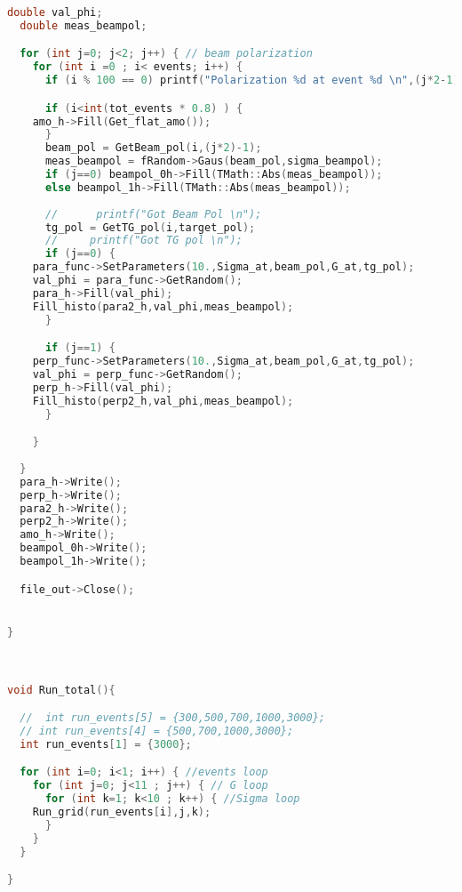 \begin{lstlisting}[language=C++]
  double val_phi;
  double meas_beampol;

  for (int j=0; j<2; j++) { // beam polarization
    for (int i =0 ; i< events; i++) {
      if (i % 100 == 0) printf("Polarization %d at event %d \n",(j*2-1),i);

      if (i<int(tot_events * 0.8) ) {
	amo_h->Fill(Get_flat_amo());
      }
      beam_pol = GetBeam_pol(i,(j*2)-1);
      meas_beampol = fRandom->Gaus(beam_pol,sigma_beampol);
      if (j==0) beampol_0h->Fill(TMath::Abs(meas_beampol));
      else beampol_1h->Fill(TMath::Abs(meas_beampol));
   
      //      printf("Got Beam Pol \n");
      tg_pol = GetTG_pol(i,target_pol);
      //     printf("Got TG pol \n");
      if (j==0) {
	para_func->SetParameters(10.,Sigma_at,beam_pol,G_at,tg_pol);
	val_phi = para_func->GetRandom();
	para_h->Fill(val_phi);
	Fill_histo(para2_h,val_phi,meas_beampol);
      }

      if (j==1) {
	perp_func->SetParameters(10.,Sigma_at,beam_pol,G_at,tg_pol);
	val_phi = perp_func->GetRandom();
	perp_h->Fill(val_phi);
	Fill_histo(perp2_h,val_phi,meas_beampol);
      }

    }
    
  }
  para_h->Write();
  perp_h->Write();
  para2_h->Write();
  perp2_h->Write();
  amo_h->Write();
  beampol_0h->Write();
  beampol_1h->Write();

  file_out->Close();


}



void Run_total(){

  //  int run_events[5] = {300,500,700,1000,3000};
  // int run_events[4] = {500,700,1000,3000};
  int run_events[1] = {3000};

  for (int i=0; i<1; i++) { //events loop 
    for (int j=0; j<11 ; j++) { // G loop
      for (int k=1; k<10 ; k++) { //Sigma loop
	Run_grid(run_events[i],j,k);
      }
    }
  }

}


  
\end{lstlisting}


